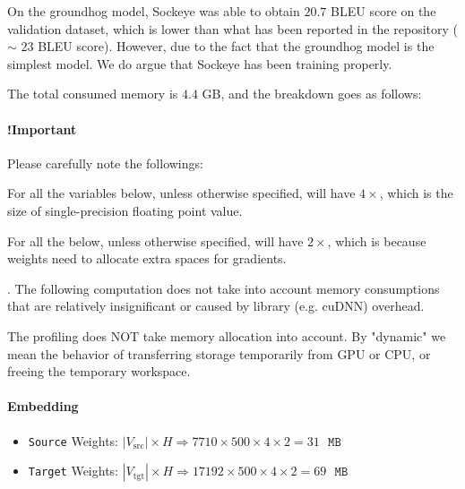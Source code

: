 \documentclass{article}
\begin{document}
On the groundhog model, Sockeye \cite{sockeye} was able to obtain \(20.7\) BLEU score on the validation dataset,
which is lower than what has been reported in the 
 \cite{tf-nmt} repository (\(\sim\) \(23\) BLEU score).
However, due to the fact that the groundhog model is 
the simplest model. We do argue that Sockeye has been training properly.

The total consumed memory is \(4.4\) GB, and the breakdown goes as follows:

\paragraph{!Important}
Please carefully note the followings:
\begin{enumerate*}[(1)]
  \item For all the variables below, unless otherwise specified, will have  \(4\times\),
  which is the size of single-precision floating point value.
  \item For all the  below, unless otherwise specified, will have  \(2\times\),
  which is because weights need to allocate extra spaces for gradients.
  \item {}. 
  The following computation does not take into account memory consumptions that are 
  relatively insignificant or caused by library (e.g. cuDNN) overhead.
  \item The profiling does NOT take  memory allocation into account. 
  By "dynamic" we mean the behavior of transferring storage temporarily from GPU or CPU,
  or freeing the temporary workspace.
\end{enumerate*}

\newcommand{\MB}{\text{ }\mathtt{MB}}

\paragraph{Embedding}
\begin{itemize}
  \item \lstinline{Source} Weights: \(|V_\text{src}|\times H\Rightarrow  7710\times 500\times 4\times 2=31\MB\)
  \item \lstinline{Target} Weights: \(|V_\text{tgt}|\times H\Rightarrow 17192\times 500\times 4\times 2=69\MB\)
\end{itemize}
\end{document}
